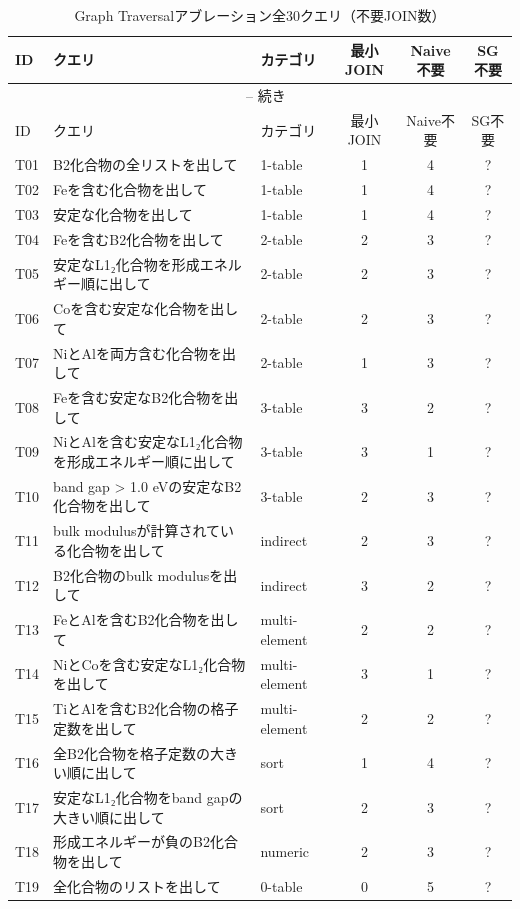 \documentclass[3p]{elsarticle}
\begin{document}
\begin{longtable}{lp{4.5cm}lccc}
\caption{Graph Traversalアブレーション全30クエリ（不要JOIN数）}
\label{tab:traversal_full} \\
\toprule
ID & クエリ & カテゴリ & 最小JOIN & Naive不要 & SG不要 \\
\midrule
\endfirsthead
\multicolumn{6}{c}{\tablename~\thetable{} -- 続き} \\
\toprule
ID & クエリ & カテゴリ & 最小JOIN & Naive不要 & SG不要 \\
\midrule
\endhead
\bottomrule
\endfoot

  T01 & B2化合物の全リストを出して & 1-table & 1 & 4 & ? \\
  T02 & Feを含む化合物を出して & 1-table & 1 & 4 & ? \\
  T03 & 安定な化合物を出して & 1-table & 1 & 4 & ? \\
  T04 & Feを含むB2化合物を出して & 2-table & 2 & 3 & ? \\
  T05 & 安定なL1₂化合物を形成エネルギー順に出して & 2-table & 2 & 3 & ? \\
  T06 & Coを含む安定な化合物を出して & 2-table & 2 & 3 & ? \\
  T07 & NiとAlを両方含む化合物を出して & 2-table & 1 & 3 & ? \\
  T08 & Feを含む安定なB2化合物を出して & 3-table & 3 & 2 & ? \\
  T09 & NiとAlを含む安定なL1₂化合物を形成エネルギー順に出して & 3-table & 3 & 1 & ? \\
  T10 & band gap > 1.0 eVの安定なB2化合物を出して & 3-table & 2 & 3 & ? \\
  T11 & bulk modulusが計算されている化合物を出して & indirect & 2 & 3 & ? \\
  T12 & B2化合物のbulk modulusを出して & indirect & 3 & 2 & ? \\
  T13 & FeとAlを含むB2化合物を出して & multi-element & 2 & 2 & ? \\
  T14 & NiとCoを含む安定なL1₂化合物を出して & multi-element & 3 & 1 & ? \\
  T15 & TiとAlを含むB2化合物の格子定数を出して & multi-element & 2 & 2 & ? \\
  T16 & 全B2化合物を格子定数の大きい順に出して & sort & 1 & 4 & ? \\
  T17 & 安定なL1₂化合物をband gapの大きい順に出して & sort & 2 & 3 & ? \\
  T18 & 形成エネルギーが負のB2化合物を出して & numeric & 2 & 3 & ? \\
  T19 & 全化合物のリストを出して & 0-table & 0 & 5 & ? \\

\end{longtable}
\end{document}
